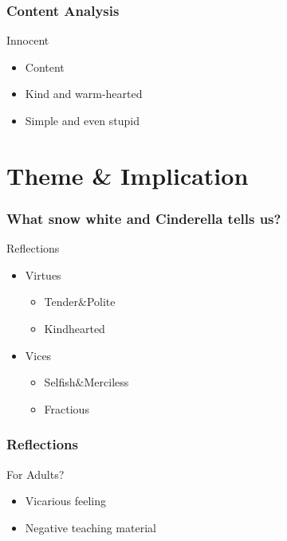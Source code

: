 \documentclass{beamer}
\begin{document}
\begin{frame}
    \frametitle{Content Analysis}
    \begin{block}{Innocent}
        \begin{itemize}
            \item Content
            \item Kind and warm-hearted
            \item Simple and even stupid
        \end{itemize}
    \end{block}
\end{frame}


\section{Theme \& Implication}
\begin{frame}
    \frametitle{What snow white and Cinderella tells us?}
    \begin{block}{Reflections}
        \begin{itemize}
            \item Virtues
                  \begin{itemize}
                      \item Tender$\&$Polite
                      \item Kindhearted
                  \end{itemize}
            \item Vices
                  \begin{itemize}
                      \item Selfish$\&$Merciless
                      \item Fractious
                  \end{itemize}
        \end{itemize}
    \end{block}
\end{frame}

\begin{frame}
    \frametitle{Reflections}
    \begin{block}{For Adults?}
        \begin{itemize}
            \item Vicarious feeling
            \item Negative teaching material
        \end{itemize}
    \end{block}
\end{frame}
\end{document}
